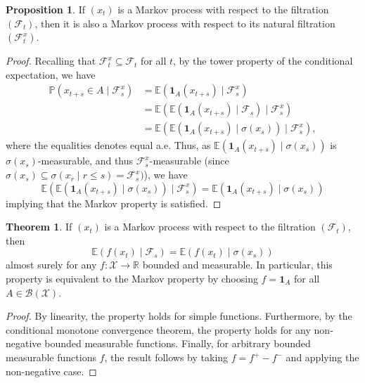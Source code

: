 \documentclass[]{article}
\theoremstyle{definition}
\newtheorem{theorem}{Theorem}
\theoremstyle{definition}
\newtheorem{proposition}{Proposition}[section]
\begin{document}
\begin{proposition}
  If \((x_t)\) is a Markov process with respect to the filtration \((\mathcal{F}_t)\), 
  then it is also a Markov process with respect to its natural filtration \((\mathcal{F}_t^x)\).
\end{proposition}
\begin{proof}
  Recalling that \(\mathcal{F}_t^x \subseteq \mathcal{F}_t\) for all \(t\),
  by the tower property of the conditional expectation, we have 
  \[\begin{split}
    \mathbb{P}(x_{t + s} \in A \mid \mathcal{F}_s^x) & = 
    \mathbb{E}(\mathbf{1}_A(x_{t + s}) \mid \mathcal{F}_s^x) \\
    & = \mathbb{E}(\mathbb{E}(\mathbf{1}_A(x_{t + s}) \mid \mathcal{F}_s) \mid \mathcal{F}_s^x)\\
    & = \mathbb{E}(\mathbb{E}(\mathbf{1}_A(x_{t + s}) \mid \sigma(x_s)) \mid \mathcal{F}_s^x),
  \end{split}\]  
  where the equalities denotes equal a.e. Thus, as \(\mathbb{E}(\mathbf{1}_A(x_{t + s}) \mid \sigma(x_s))\) 
  is \(\sigma(x_s)\)-measurable, and thus \(\mathcal{F}_s^x\)-measurable (since 
  \(\sigma(x_s) \subseteq \sigma(x_r \mid r \le s) = \mathcal{F}_s^x)\)), we have 
  \[\mathbb{E}(\mathbb{E}(\mathbf{1}_A(x_{t + s}) \mid \sigma(x_s)) \mid \mathcal{F}_s^x) = 
  \mathbb{E}(\mathbf{1}_A(x_{t + s}) \mid \sigma(x_s))\]
  implying that the Markov property is satisfied.
\end{proof}

\begin{theorem}
  If \((x_t)\) is a Markov process with respect to the filtration \((\mathcal{F}_t)\), 
  then 
  \[\mathbb{E}(f(x_t) \mid \mathcal{F}_s) = \mathbb{E}(f(x_t) \mid \sigma(x_s))\]
  almost surely for any \(f : \mathcal{X} \to \mathbb{R}\) bounded and measurable. 
  In particular, this property is equivalent to the Markov property by choosing 
  \(f = \mathbf{1}_A\) for all \(A \in \mathcal{B}(\mathcal{X})\).
\end{theorem}
\begin{proof}
  By linearity, the property holds for simple functions. Furthermore, by the 
  conditional monotone convergence theorem, the property holds for any non-negative 
  bounded measurable functions. Finally, for arbitrary bounded measurable functions 
  \(f\), the result follows by taking \(f = f^+ - f^-\) and applying the non-negative 
  case.
\end{proof}
\end{document}

